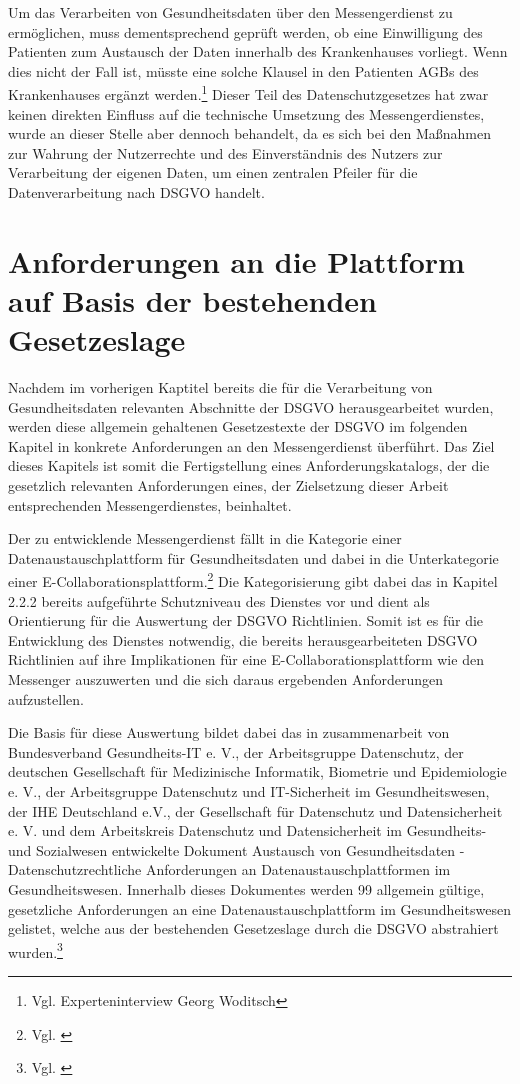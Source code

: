 Um das Verarbeiten von Gesundheitsdaten über den Messengerdienst zu ermöglichen, muss dementsprechend geprüft werden, ob eine Einwilligung des Patienten zum Austausch der Daten innerhalb des Krankenhauses vorliegt. Wenn dies nicht der Fall ist, müsste eine solche Klausel in den Patienten AGBs des Krankenhauses ergänzt werden.\footnote{Vgl. Experteninterview Georg Woditsch} Dieser Teil des Datenschutzgesetzes hat zwar keinen direkten Einfluss auf die technische Umsetzung des Messengerdienstes, wurde an dieser Stelle aber dennoch behandelt, da es sich bei den Maßnahmen zur Wahrung der Nutzerrechte und des Einverständnis des Nutzers zur Verarbeitung der eigenen Daten, um einen zentralen Pfeiler für die Datenverarbeitung nach DSGVO handelt.

\section{Anforderungen an die Plattform auf Basis der bestehenden Gesetzeslage}\label{section:aadpabsbg}
Nachdem im vorherigen Kaptitel bereits die für die Verarbeitung von Gesundheitsdaten relevanten Abschnitte der DSGVO herausgearbeitet wurden, werden diese allgemein gehaltenen Gesetzestexte der DSGVO im folgenden Kapitel in konkrete Anforderungen an den Messengerdienst überführt.  Das Ziel dieses Kapitels ist somit die Fertigstellung eines Anforderungskatalogs, der die gesetzlich relevanten Anforderungen eines, der Zielsetzung dieser Arbeit entsprechenden Messengerdienstes, beinhaltet.

Der zu entwicklende Messengerdienst fällt in die Kategorie einer Datenaustauschplattform für Gesundheitsdaten und dabei in die Unterkategorie einer E-Collaborationsplattform.\footnote{Vgl. \cite[S. 14 ff.]{Bundesverband-Gesundheits-IT-e.V.2016}} Die Kategorisierung gibt dabei das in Kapitel 2.2.2 bereits aufgeführte Schutzniveau des Dienstes vor und dient als Orientierung für die Auswertung der DSGVO Richtlinien. Somit ist es für die Entwicklung des Dienstes notwendig, die bereits herausgearbeiteten DSGVO Richtlinien auf ihre Implikationen für eine E-Collaborationsplattform wie den Messenger auszuwerten und die sich daraus ergebenden Anforderungen aufzustellen. 

Die Basis für diese Auswertung bildet dabei das in zusammenarbeit von Bundesverband Gesundheits-IT e. V., der Arbeitsgruppe Datenschutz, der deutschen Gesellschaft für Medizinische Informatik, Biometrie und Epidemiologie e. V., der Arbeitsgruppe Datenschutz und IT-Sicherheit im Gesundheitswesen, der IHE Deutschland e.V., der Gesellschaft für Datenschutz und Datensicherheit e. V. und dem Arbeitskreis Datenschutz und Datensicherheit im Gesundheits- und Sozialwesen entwickelte Dokument \glqq Austausch von Gesundheitsdaten - Datenschutzrechtliche Anforderungen an Datenaustauschplattformen im Gesundheitswesen\grqq. Innerhalb dieses Dokumentes werden 99 allgemein gültige, gesetzliche Anforderungen an eine Datenaustauschplattform im Gesundheitswesen gelistet, welche aus der bestehenden Gesetzeslage durch die DSGVO abstrahiert wurden.\footnote{Vgl. \cite[S. 19 ff.]{Bundesverband-Gesundheits-IT-e.V.2016}}


